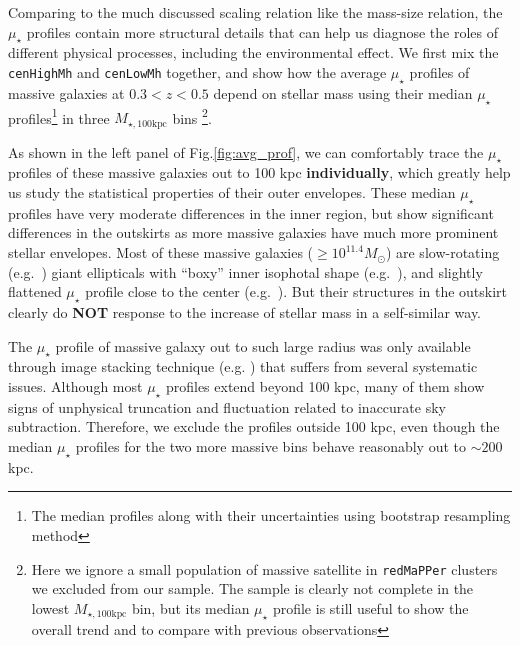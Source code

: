 \documentclass{emulateapj}
\def\ser{{S\'{e}rsic\ }}
\def\redm{\texttt{redMaPPer}}
\def\rbcg{\texttt{cenHighMh}}
\def\nbcg{\texttt{cenLowMh}}
\def\mtot{{$M_{\star,100\mathrm{kpc}}$}}
\def\mden{{$\mu_{\star}$}}
\begin{document}
\begin{CJK*}{UTF8}{gbsn}
    Comparing to the much discussed scaling relation like the mass-size relation, 
    the \mden{} profiles contain more structural details that can help us diagnose the 
    roles of different physical processes, including the environmental effect.  
    We first mix the \rbcg{} and \nbcg{} together, and show how the average \mden{}
    profiles of massive galaxies at $0.3 < z < 0.5$ depend on stellar mass using their 
    median \mden{} profiles\footnote{The median profiles along with their uncertainties 
    using bootstrap resampling method} in three \mtot{} bins \footnote{Here we ignore a 
    small population of massive satellite in \redm{} clusters we excluded from our 
    sample.
    The sample is clearly not complete in the lowest \mtot{} bin, but its median \mden{}
    profile is still useful to show the overall trend and to compare with previous 
    observations}.

    As shown in the left panel of Fig.\ref{fig:avg_prof}, we can comfortably trace 
    the \mden{} profiles of these massive galaxies out to 100 kpc \textbf{individually}, 
    which greatly help us study the statistical properties of their outer envelopes. 
    These median \mden{} profiles have very moderate differences in the inner region, 
    but show significant differences in the outskirts as more massive galaxies have 
    much more prominent stellar envelopes.
    Most of these massive galaxies ($\ge 10^{11.4} M_{\odot}$) are slow-rotating 
    (e.g.\ \citealt{Cappellari13b}) giant ellipticals with ``boxy'' inner isophotal 
    shape (e.g.\ \citealt{Kormendy2009}), and slightly flattened \mden{} profile close 
    to the center (e.g.\ \citealt{Lauer07}).
    But their structures in the outskirt clearly do \textbf{NOT} response to the 
    increase of stellar mass in a self-similar way.

    The \mden{} profile of massive galaxy out to such large radius was only available 
    through image stacking technique (e.g. \citep{Tal2011, DSouza2015}) 
    that suffers from several systematic issues.
    Although most \mden{} profiles extend beyond 100 kpc, many of them show signs of 
    unphysical truncation and fluctuation related to inaccurate sky subtraction.  
    Therefore, we exclude the profiles outside 100 kpc, even though the median \mden{} 
    profiles for the two more massive bins behave reasonably out to $\sim 200$ kpc. 
      
    

\end{CJK*}
\end{document}
